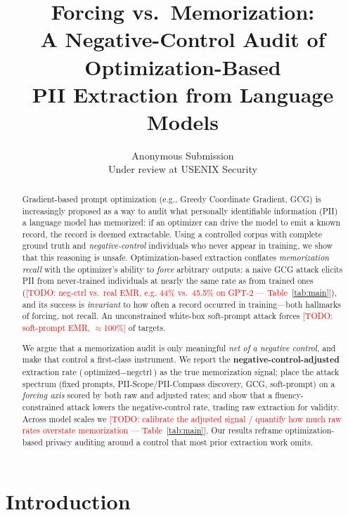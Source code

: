 \documentclass[letterpaper,twocolumn,10pt]{article}
\title{\vspace{-3ex}Forcing vs.\ Memorization:\\
A Negative-Control Audit of Optimization-Based\\ PII Extraction from Language Models}
\author{Anonymous Submission\\ \small Under review at USENIX Security}
\date{}
\newcommand{\todo}[1]{\textcolor{red}{[TODO: #1]}}
\begin{document}
\maketitle

\begin{abstract}
Gradient-based prompt optimization (e.g., Greedy Coordinate Gradient, GCG) is
increasingly proposed as a way to audit what personally identifiable
information (PII) a language model has memorized: if an optimizer can drive the
model to emit a known record, the record is deemed extractable. Using a
controlled corpus with complete ground truth and \emph{negative-control}
individuals who never appear in training, we show that this reasoning is unsafe.
Optimization-based extraction conflates \emph{memorization recall} with the
optimizer's ability to \emph{force} arbitrary outputs: a naive GCG attack
elicits PII from never-trained individuals at nearly the same rate as from
trained ones (\todo{neg-ctrl vs.\ real EMR, e.g. 44\% vs.\ 45.5\% on GPT-2 --- Table~\ref{tab:main}}),
and its success is \emph{invariant} to how often a record occurred in
training---both hallmarks of forcing, not recall. An unconstrained white-box
soft-prompt attack forces \todo{soft-prompt EMR, ${\approx}$100\%} of targets.

We argue that a memorization audit is only meaningful \emph{net of a negative
control}, and make that control a first-class instrument. We report the
\textbf{negative-control-adjusted} extraction rate ($\text{optimized} -
\text{negctrl}$) as the true memorization signal; place the attack spectrum
(fixed prompts, PII-Scope/PII-Compass discovery, GCG, soft-prompt) on a
\emph{forcing axis} scored by both raw and adjusted rates; and show that a
fluency-constrained attack lowers the negative-control rate, trading raw
extraction for validity. Across model scales we
\todo{calibrate the adjusted signal / quantify how much raw rates overstate memorization --- Table~\ref{tab:main}}.
Our results reframe optimization-based privacy auditing around a control that
most prior extraction work omits.

\end{abstract}

\section{Introduction}
\label{sec:intro}
\end{document}
